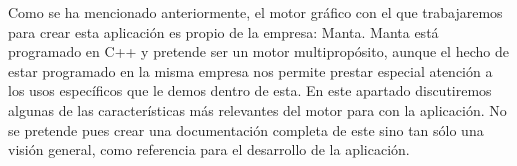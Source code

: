 Como se ha mencionado anteriormente, el motor gráfico con el que trabajaremos para crear esta aplicación es propio de la empresa: Manta. Manta está programado en C++ y pretende ser un motor multipropósito, aunque el hecho de estar programado en la misma empresa nos permite prestar especial atención a los usos específicos que le demos dentro de esta. En este apartado discutiremos algunas de las características más relevantes del motor para con la aplicación. No se pretende pues crear una documentación completa de este sino tan sólo una visión general, como referencia para el desarrollo de la aplicación.



